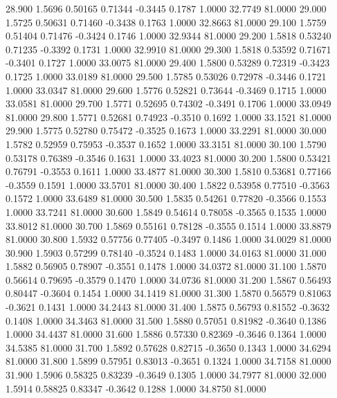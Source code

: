   28.900   1.5696   0.50165   0.71344  -0.3445   0.1787   1.0000  32.7749  81.0000
  29.000   1.5725   0.50631   0.71460  -0.3438   0.1763   1.0000  32.8663  81.0000
  29.100   1.5759   0.51404   0.71476  -0.3424   0.1746   1.0000  32.9344  81.0000
  29.200   1.5818   0.53240   0.71235  -0.3392   0.1731   1.0000  32.9910  81.0000
  29.300   1.5818   0.53592   0.71671  -0.3401   0.1727   1.0000  33.0075  81.0000
  29.400   1.5800   0.53289   0.72319  -0.3423   0.1725   1.0000  33.0189  81.0000
  29.500   1.5785   0.53026   0.72978  -0.3446   0.1721   1.0000  33.0347  81.0000
  29.600   1.5776   0.52821   0.73644  -0.3469   0.1715   1.0000  33.0581  81.0000
  29.700   1.5771   0.52695   0.74302  -0.3491   0.1706   1.0000  33.0949  81.0000
  29.800   1.5771   0.52681   0.74923  -0.3510   0.1692   1.0000  33.1521  81.0000
  29.900   1.5775   0.52780   0.75472  -0.3525   0.1673   1.0000  33.2291  81.0000
  30.000   1.5782   0.52959   0.75953  -0.3537   0.1652   1.0000  33.3151  81.0000
  30.100   1.5790   0.53178   0.76389  -0.3546   0.1631   1.0000  33.4023  81.0000
  30.200   1.5800   0.53421   0.76791  -0.3553   0.1611   1.0000  33.4877  81.0000
  30.300   1.5810   0.53681   0.77166  -0.3559   0.1591   1.0000  33.5701  81.0000
  30.400   1.5822   0.53958   0.77510  -0.3563   0.1572   1.0000  33.6489  81.0000
  30.500   1.5835   0.54261   0.77820  -0.3566   0.1553   1.0000  33.7241  81.0000
  30.600   1.5849   0.54614   0.78058  -0.3565   0.1535   1.0000  33.8012  81.0000
  30.700   1.5869   0.55161   0.78128  -0.3555   0.1514   1.0000  33.8879  81.0000
  30.800   1.5932   0.57756   0.77405  -0.3497   0.1486   1.0000  34.0029  81.0000
  30.900   1.5903   0.57299   0.78140  -0.3524   0.1483   1.0000  34.0163  81.0000
  31.000   1.5882   0.56905   0.78907  -0.3551   0.1478   1.0000  34.0372  81.0000
  31.100   1.5870   0.56614   0.79695  -0.3579   0.1470   1.0000  34.0736  81.0000
  31.200   1.5867   0.56493   0.80447  -0.3604   0.1454   1.0000  34.1419  81.0000
  31.300   1.5870   0.56579   0.81063  -0.3621   0.1431   1.0000  34.2443  81.0000
  31.400   1.5875   0.56793   0.81552  -0.3632   0.1408   1.0000  34.3463  81.0000
  31.500   1.5880   0.57051   0.81982  -0.3640   0.1386   1.0000  34.4437  81.0000
  31.600   1.5886   0.57330   0.82369  -0.3646   0.1364   1.0000  34.5385  81.0000
  31.700   1.5892   0.57628   0.82715  -0.3650   0.1343   1.0000  34.6294  81.0000
  31.800   1.5899   0.57951   0.83013  -0.3651   0.1324   1.0000  34.7158  81.0000
  31.900   1.5906   0.58325   0.83239  -0.3649   0.1305   1.0000  34.7977  81.0000
  32.000   1.5914   0.58825   0.83347  -0.3642   0.1288   1.0000  34.8750  81.0000
